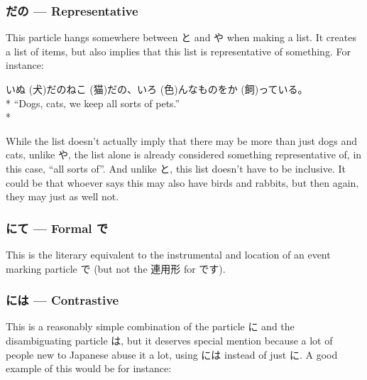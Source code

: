 \documentclass[11pt, b5paper, twoside, openright, onecolumn]{book}
\makeatletter
\newcommand*{\rubystack}[2]{{\relscale{0.5}%
  \begin{tabular}[b]{@{}c@{}}%
    {#1}\\%
   {\textscale{2}{#2}}%
  \end{tabular}}%
}
\DeclareRobustCommand*{\ruby}[2]{%
  \mbox{%
    \setlength{\parskip}{0ex}%
    \BeginAccSupp{method=pdfstringdef,ActualText={#1}}%
      \rubystack{\phantom{#2}}{#1}%
      \llap{%
        \rubystack{#2}{\phantom{#1}}%
      }%
    \EndAccSupp{}%
  }%
}
\renewcommand*{\ruby}[2]{#2 (#1)}%
\newenvironment{exampleblock}{
\setlength{\parindent}{0.6in}
\begin{minipage}[t]{\dimexpr\textwidth-\parindent}}
{\end{minipage}}
\makeatother
\begin{document}
\subsubsection{だの — Representative}


This particle hangs somewhere between と and や when making a list. It creates a list of items‚ but also implies that this list is representative of something. For instance:

\vspace{0.4cm}
\begin{exampleblock}
\ruby{犬}{いぬ}だの\ruby{猫}{ねこ}だの、\ruby{色}{いろ}んなものを\ruby{飼}{か}っている。 \\* 
“Dogs‚ cats‚ we keep all sorts of pets.” \\* 
\end{exampleblock}
\vspace{0.2cm}

While the list doesn’t actually imply that there may be more than just dogs and cats‚ unlike や‚ the list alone is already considered something representative of‚ in this case‚ “all sorts of”. And unlike と‚ this list doesn’t have to be inclusive. It could be that whoever says this may also have birds and rabbits‚ but then again‚ they may just as well not.

\subsubsection{にて — Formal で}

This is the literary equivalent to the instrumental and location of an event marking particle で (but not the 連用形 for です).

\subsubsection{には — Contrastive}

This is a reasonably simple combination of the particle に and the disambiguating particle は‚ but it deserves special mention because a lot of people new to Japanese abuse it a lot‚ using には instead of just に. A good example of this would be for instance:
\end{document}
